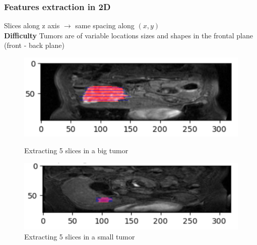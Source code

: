 \documentclass{beamer}
\begin{document}
\begin{frame}
    \frametitle{Features extraction in 2D}
    \vspace{5 pt}
    Slices along z axis $\rightarrow$ same spacing along $(x,y)$\\[5 pt]
    \textbf{Difficulty} Tumors are of variable locations sizes and shapes in the frontal plane (front - back plane)
    \begin{figure}
        \begin{minipage}{0.45\textwidth}
            \centering
            \includegraphics[scale = 0.125]{images/slices_big.png}
            \caption{Extracting 5 slices in a big tumor}
        \end{minipage}
        \hspace{0.03\textwidth} 
        \begin{minipage}{0.45\textwidth}
            \centering
            \includegraphics[scale = 0.18]{images/slices_small.png}
            \caption{Extracting 5 slices in a small tumor}
        \end{minipage}
    \end{figure}
\end{frame}
\end{document}
